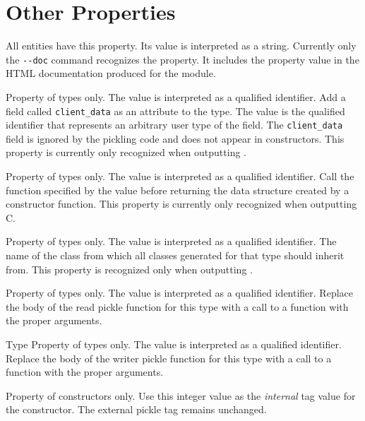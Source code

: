 \section{Other Properties}
\begin{description}
    All entities have this property. Its value is interpreted as a
    string. Currently only the \lstinline!--doc! command recognizes the
    property. It includes the property value in the HTML documentation
    produced for the module.

    Property of types only.	The value is interpreted as a qualified 
    identifier. Add a field called \lstinline!client_data! as an
    attribute to the type. The value is the qualified identifier that
    represents an arbitrary user type of the field. The \lstinline!client_data!
    field is ignored by the pickling code and does not appear in
    constructors. This property is currently only recognized when
    outputting \Cplusplus{}.

    Property of types only. The value is interpreted as a qualified
    identifier. Call the function specified by the value before
    returning the data structure created by a constructor function.
    This property is currently only recognized when outputting C.

    Property of types only. The value is interpreted as a qualified
    identifier. The name of the class from which all classes generated
    for that type should inherit from. This property is recognized only
    when outputting \Cplusplus{}.
    
   Property of types only. The value is interpreted as a qualified
   identifier.  Replace the body of the read pickle function for this
   type with a call to a function with the proper arguments. 

  Type
   Property of types only. The value is interpreted as a qualified
   identifier.  Replace the body of the writer pickle function for this
   type with a call to a function with the proper arguments. 

   Property of constructors only.
   Use this integer value as the \emph{internal} tag value for the
   constructor. The external pickle tag remains unchanged. 

\end{description}%
